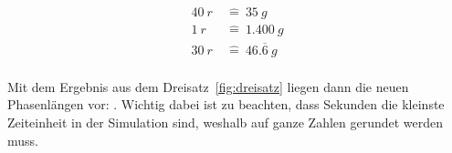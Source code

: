\begin{align}
    40~\unit{r}~&\widehat{=}~35~\unit{g} \\
    1~\unit{r}~&\widehat{=}~1.400~\unit{g} \\
    30~\unit{r}~&\widehat{=}~46.\overline{6}~\unit{g} \\
    \label{fig:dreisatz}
\end{align}

Mit dem Ergebnis aus dem Dreisatz~\ref{fig:dreisatz} liegen dann die neuen Phasenlängen vor: .
Wichtig dabei ist zu beachten, dass Sekunden die kleinste Zeiteinheit in der Simulation sind, weshalb auf ganze Zahlen gerundet werden muss.
